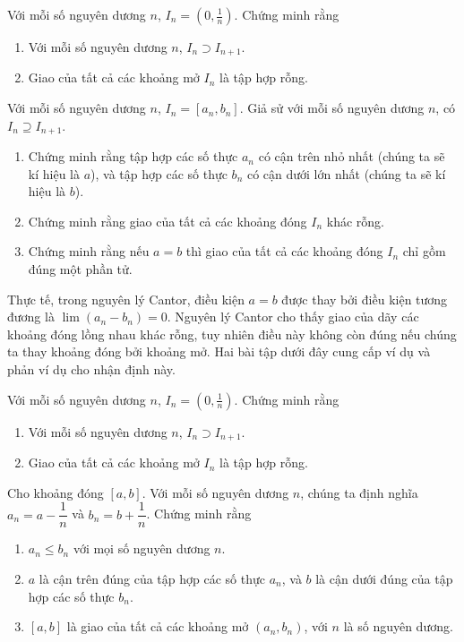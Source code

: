 \begin{exercise}
	Với mỗi số nguyên dương $n$, $I_{n} = (0, \frac{1}{n})$. Chứng minh rằng
	\begin{enumerate}[label={(\roman*)}]
		\item Với mỗi số nguyên dương $n$, $I_{n}\supset I_{n+1}$.
		\item Giao của tất cả các khoảng mở $I_{n}$ là tập hợp rỗng.
	\end{enumerate}
\end{exercise}\begin{exercise}
	Với mỗi số nguyên dương $n$, $I_{n} = [a_{n}, b_{n}]$. Giả sử với mỗi số nguyên dương $n$, có $I_{n} \supseteq I_{n+1}$.
	\begin{enumerate}[label={(\roman*)}]
		\item Chứng minh rằng tập hợp các số thực $a_{n}$ có cận trên nhỏ nhất (chúng ta sẽ kí hiệu là $a$), và tập hợp các số thực $b_{n}$ có cận dưới lớn nhất (chúng ta sẽ kí hiệu là $b$).
		\item Chứng minh rằng giao của tất cả các khoảng đóng $I_{n}$ khác rỗng.
		\item Chứng minh rằng nếu $a = b$ thì giao của tất cả các khoảng đóng $I_{n}$ chỉ gồm đúng một phần tử.
	\end{enumerate}
\end{exercise}

Thực tế, trong nguyên lý Cantor, điều kiện $a = b$ được thay bởi điều kiện tương đương là $\lim (a_{n} - b_{n}) = 0$. Nguyên lý Cantor cho thấy giao của dãy các khoảng đóng lồng nhau khác rỗng, tuy nhiên điều này không còn đúng nếu chúng ta thay khoảng đóng bởi khoảng mở. Hai bài tập dưới đây cung cấp ví dụ và phản ví dụ cho nhận định này.

\begin{exercise}
	Với mỗi số nguyên dương $n$, $I_{n} = (0, \frac{1}{n})$. Chứng minh rằng
	\begin{enumerate}[label={(\roman*)}]
		\item Với mỗi số nguyên dương $n$, $I_{n}\supset I_{n+1}$.
		\item Giao của tất cả các khoảng mở $I_{n}$ là tập hợp rỗng.
	\end{enumerate}
\end{exercise}

\begin{exercise}
	Cho khoảng đóng $[a, b]$. Với mỗi số nguyên dương $n$, chúng ta định nghĩa $a_{n} = a - \dfrac{1}{n}$ và $b_{n} = b + \dfrac{1}{n}$. Chứng minh rằng
	\begin{enumerate}[label={(\roman*)}]
		\item $a_{n}\leq b_{n}$ với mọi số nguyên dương $n$.
		\item $a$ là cận trên đúng của tập hợp các số thực $a_{n}$, và $b$ là cận dưới đúng của tập hợp các số thực $b_{n}$.
		\item $[a, b]$ là giao của tất cả các khoảng mở $(a_{n}, b_{n})$, với $n$ là số nguyên dương.
	\end{enumerate}
\end{exercise}

